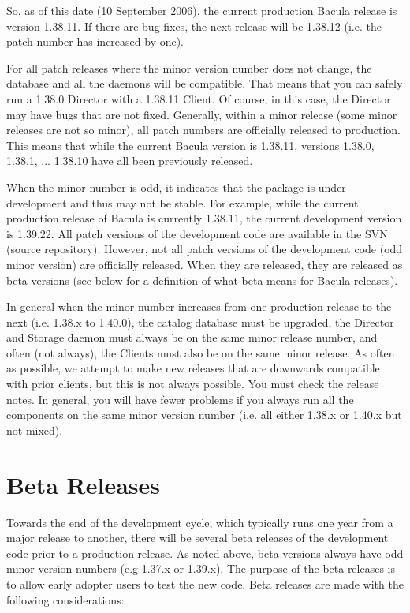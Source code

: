 So, as of this date (10 September 2006), the current production Bacula
release is version 1.38.11.  If there are bug fixes, the next release
will be 1.38.12 (i.e. the patch number has increased by one).

For all patch releases where the minor version number does not change,
the database and all the daemons will be compatible.  That means that
you can safely run a 1.38.0 Director with a 1.38.11 Client.  Of course,
in this case, the Director may have bugs that are not fixed. Generally,
within a minor release (some minor releases are not so minor), all
patch numbers are officially released to production. This means that while
the current Bacula version is 1.38.11, versions 1.38.0, 1.38.1, ... 1.38.10
have all been previously released.

When the minor number is odd, it indicates that the package is under 
development and thus may not be stable. For example, while the current 
production release of Bacula is currently 1.38.11, the current development
version is 1.39.22. All patch versions of the development code are 
available in the SVN (source repository).  However, not all patch versions
of the development code (odd minor version) are officially released. When
they are released, they are released as beta versions (see below for a
definition of what beta means for Bacula releases).                     

In general when the minor number increases from one production release
to the next (i.e. 1.38.x to 1.40.0), the catalog database must be upgraded,
the Director and Storage daemon must always be on the same minor release
number, and often (not always), the Clients must also be on the same minor
release. As often as possible, we attempt to make new releases that are
downwards compatible with prior clients, but this is not always possible.
You must check the release notes.  In general, you will have fewer problems
if you always run all the components on the same minor version number (i.e.
all either 1.38.x or 1.40.x but not mixed).


\label{BetaReleases}
\section*{Beta Releases}
Towards the end of the development cycle, which typically runs
one year from a major release to another, there will be several beta
releases of the development code prior to a production release.  
As noted above, beta versions always have odd minor version numbers
(e.g 1.37.x or 1.39.x). 
The purpose of the beta releases is to allow early adopter users to test
the new code.  Beta releases are made with the following considerations:

